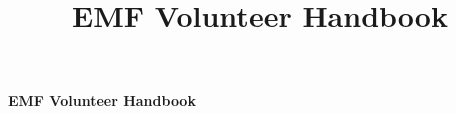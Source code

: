 \documentclass[a4paper]{article}
\title{EMF Volunteer Handbook}
\begin{document}
\begin{center}
  {\bf \LARGE EMF Volunteer Handbook}\\[36pt]
\end{center}
\tableofcontents

\newpage


\end{document}
